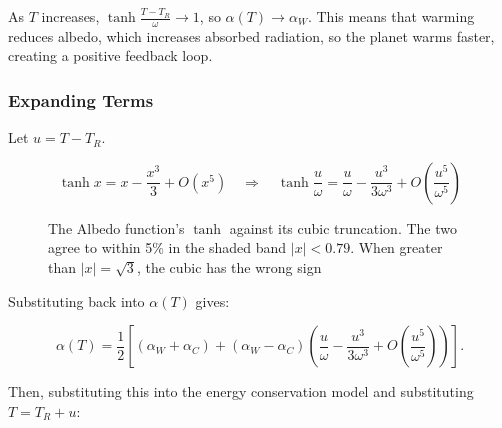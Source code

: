     As $T$ increases, $\tanh\frac{T-T_R}{\omega}\rightarrow1$, so $\alpha(T)\rightarrow \alpha_W$. This means that warming reduces albedo, which increases absorbed radiation, so the planet warms faster, creating a positive feedback loop.

    \subsubsection{Expanding Terms}\label{subsubsec:expanding-terms}

    Let $u=T-T_R$.

    \[
        \tanh x = x - \frac{x^3}{3} + O(x^5) \quad\Rightarrow\quad \tanh\frac{u}{\omega} = \frac{u}{\omega} - \frac{u^3}{3\omega^3} + O\!\left(\frac{u^5}{\omega^5}\right)
    \]
    
\begin{figure}[H]
    \centering
    \caption{The Albedo function's $\tanh$ against its cubic truncation. The two agree to within 5\% in the shaded band $|x|<0.79$. When greater than $|x|=\sqrt3$, the cubic has the wrong sign}
    \label{fig:tanh-cubic}
\end{figure}

    Substituting back into $\alpha(T)$ gives:

    \[
        \alpha(T)=\frac{1}{2}\left[\left(\alpha_W+\alpha_C\right)+\left(\alpha_W-\alpha_C\right)\left(\frac{u}{\omega}-\frac{u^3}{3\omega^3}+O\left(\frac{u^5}{\omega^5}\right)\right)\right].
    \]

    Then, substituting this into the energy conservation model and substituting $T=T_R+u$:

